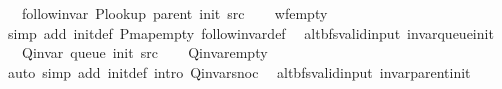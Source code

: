 \begin{isabellebody}
\ \ \ {\isachardoublequoteopen}follow{\isacharunderscore}{\kern0pt}invar\ {\isacharparenleft}{\kern0pt}P{\isacharunderscore}{\kern0pt}lookup\ {\isacharparenleft}{\kern0pt}parent\ {\isacharparenleft}{\kern0pt}init\ src{\isacharparenright}{\kern0pt}{\isacharparenright}{\kern0pt}{\isacharparenright}{\kern0pt}{\isachardoublequoteclose}%
\endisataginvisible
{\isafoldinvisible}%
%
\isadeliminvisible
\isanewline
%
\endisadeliminvisible
%
\isadelimproof
\ \ %
\endisadelimproof
%
\isatagproof
{}\isamarkupfalse%
\ wf{\isacharunderscore}{\kern0pt}empty\isanewline
\ \ \isamarkupfalse%
\ {\isacharparenleft}{\kern0pt}simp\ add{\isacharcolon}{\kern0pt}\ init{\isacharunderscore}{\kern0pt}def\ P{\isachardot}{\kern0pt}map{\isacharunderscore}{\kern0pt}empty\ follow{\isacharunderscore}{\kern0pt}invar{\isacharunderscore}{\kern0pt}def{\isacharparenright}{\kern0pt}%
\endisatagproof
{\isafoldproof}%
%
\isadelimproof
\isanewline
%
\endisadelimproof
%
\isadeliminvisible
\isanewline
%
\endisadeliminvisible
%
\isataginvisible
{}\isamarkupfalse%
\ {\isacharparenleft}{\kern0pt}\ alt{\isacharunderscore}{\kern0pt}bfs{\isacharunderscore}{\kern0pt}valid{\isacharunderscore}{\kern0pt}input{\isacharparenright}{\kern0pt}\ invar{\isacharunderscore}{\kern0pt}queue{\isacharunderscore}{\kern0pt}init{\isacharcolon}{\kern0pt}\isanewline
\ \ \ {\isachardoublequoteopen}Q{\isacharunderscore}{\kern0pt}invar\ {\isacharparenleft}{\kern0pt}queue\ {\isacharparenleft}{\kern0pt}init\ src{\isacharparenright}{\kern0pt}{\isacharparenright}{\kern0pt}{\isachardoublequoteclose}%
\endisataginvisible
{\isafoldinvisible}%
%
\isadeliminvisible
\isanewline
%
\endisadeliminvisible
%
\isadelimproof
\ \ %
\endisadelimproof
%
\isatagproof
{}\isamarkupfalse%
\ Q{\isachardot}{\kern0pt}invar{\isacharunderscore}{\kern0pt}empty\isanewline
\ \ \isamarkupfalse%
\ {\isacharparenleft}{\kern0pt}auto\ simp\ add{\isacharcolon}{\kern0pt}\ init{\isacharunderscore}{\kern0pt}def\ intro{\isacharcolon}{\kern0pt}\ Q{\isachardot}{\kern0pt}invar{\isacharunderscore}{\kern0pt}snoc{\isacharparenright}{\kern0pt}%
\endisatagproof
{\isafoldproof}%
%
\isadelimproof
\isanewline
%
\endisadelimproof
%
\isadeliminvisible
\isanewline
%
\endisadeliminvisible
%
\isataginvisible
{}\isamarkupfalse%
\ {\isacharparenleft}{\kern0pt}\ alt{\isacharunderscore}{\kern0pt}bfs{\isacharunderscore}{\kern0pt}valid{\isacharunderscore}{\kern0pt}input{\isacharparenright}{\kern0pt}\ invar{\isacharunderscore}{\kern0pt}parent{\isacharunderscore}{\kern0pt}init{\isacharcolon}{\kern0pt}\isanewline

\end{isabellebody}
